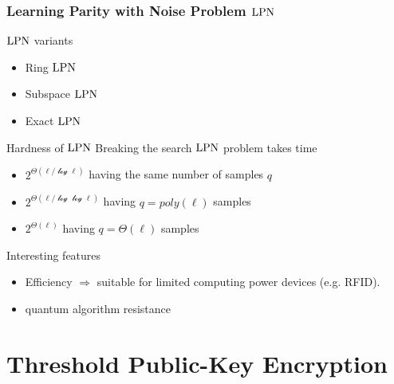 \begin{frame}
 \frametitle{Learning Parity with Noise Problem $\mathrm{LPN}$}


  \begin{block}{$\mathrm{LPN}$ variants}
    \begin{itemize}
      \item Ring $\mathrm{LPN}$
      \item Subspace $\mathrm{LPN}$
      \item Exact $\mathrm{LPN}$
    \end{itemize} 
  \end{block}

  \begin{block}{Hardness of $\mathrm{LPN}$}
  Breaking the search $\mathrm{LPN}$ problem takes time
  \begin{itemize}
   \item $2^{\mathcal{\varTheta}(\mathcal{\ell / \log{\ell}})}$ having the same number of samples $q$
   \item $2^{\mathcal{\varTheta}(\mathcal{\ell / \log{ \log {\ell} } })}$ having $q=poly(\ell)$ samples
   \item $2^{\mathcal{\varTheta}(\mathcal{\ell})}$ having $q= \mathcal{\varTheta}(\ell)$ samples
  \end{itemize}

  \end{block}

  \begin{block}{Interesting features}
    \begin{itemize}
      \item Efficiency $\Rightarrow$ suitable for limited computing power devices (e.g. RFID).
      \item quantum algorithm resistance
    \end{itemize}
  \end{block}

\end{frame}

\section{Threshold Public-Key Encryption}

